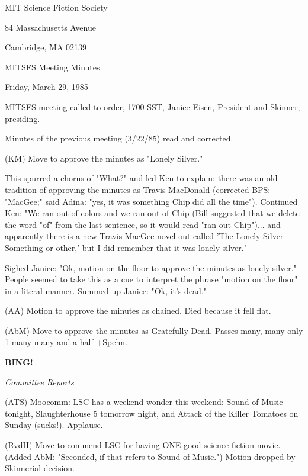 \documentclass[12pt]{article}
\newcommand{\bing}{{\bf BING!} }
\newcommand{\goto}[1]{\bing \vskip 12pt \centerline{{\em{#1}}}}
\begin{document}
\begin{center}

MIT Science Fiction Society 

84 Massachusetts Avenue

Cambridge, MA 02139

\vspace{12pt}

MITSFS Meeting Minutes 

Friday, March 29, 1985

\end{center}
 
\vspace{18pt}

\setlength{\parskip}{6pt}

\noindent
MITSFS meeting called to order, 1700 SST,
Janice Eisen, President and Skinner, presiding.

Minutes of the previous meeting (3/22/85) read and corrected.

(KM) Move to approve the minutes as "Lonely Silver."

This spurred a chorus of "What?" and led Ken to explain: there was an old tradition of approving the minutes as Travis MacDonald (corrected BPS: "MacGee;" said Adina: "yes, it was something Chip did all the time"). Continued Ken: "We ran out of colors and we ran out of Chip (Bill suggested that we delete the word "of" from the last sentence, so it would read "ran out Chip")... and apparently there is a new Travis MacGee novel out called 'The Lonely Silver Something-or-other,' but I did remember that it was lonely silver."

Sighed Janice: "Ok, motion on the floor to approve the minutes as lonely silver." People seemed to take this as a cue to interpret the phrase "motion on the floor" in a literal manner. Summed up Janice: "Ok, it's dead."

(AA) Motion to approve the minutes as chained. Died because it fell flat.

(AbM) Move to approve the minutes as Gratefully Dead. Passes many, many-only 1 many-many and a half +Spehn.

\goto{Committee Reports}

(ATS) Moocomm: LSC has a weekend wonder this weekend: Sound of Music tonight, Slaughterhouse 5 tomorrow night, and Attack of the Killer Tomatoes on Sunday (sucks!). Applause.

(RvdH) Move to commend LSC for having ONE good science fiction movie. (Added AbM: "Seconded, if that refers to Sound of Music.") Motion dropped by Skinnerial decision.
\end{document}
